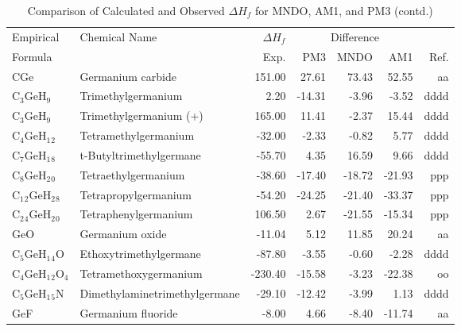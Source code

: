 \begin{table}
\caption{Comparison of Calculated and Observed $\Delta H_f$ 
for MNDO, AM1, and PM3 (contd.)}
\begin{center}
\compresstable
\begin{tabular}{llrrrrr}
Empirical & Chemical Name & $\Delta H_f$ & \multicolumn{3}{c}{Difference} & \\
Formula   &               & Exp. & PM3 &  MNDO  &  AM1 &     Ref.\\
\hline
 CGe         & Germanium carbide                      &   151.00    &    27.61  &    73.43  &    52.55  &     aa\\
 C$_3$GeH$_9$      & Trimethylgermanium                     &     2.20    &   -14.31  &    -3.96  &    -3.52  &   dddd\\
 C$_3$GeH$_9$      & Trimethylgermanium (+)                 &   165.00    &    11.41  &    -2.37  &    15.44  &   dddd\\
 C$_4$GeH$_1$$_2$     & Tetramethylgermanium                   &   -32.00    &    -2.33  &    -0.82  &     5.77  &   dddd\\
 C$_7$GeH$_1$$_8$     & t-Butyltrimethylgermane                &   -55.70    &     4.35  &    16.59  &     9.66  &   dddd\\
 C$_8$GeH$_2$$_0$     & Tetraethylgermanium                    &   -38.60    &   -17.40  &   -18.72  &   -21.93  &    ppp\\
 C$_1$$_2$GeH$_2$$_8$    & Tetrapropylgermanium                   &   -54.20    &   -24.25  &   -21.40  &   -33.37  &    ppp\\
 C$_2$$_4$GeH$_2$$_0$    & Tetraphenylgermanium                   &   106.50    &     2.67  &   -21.55  &   -15.34  &    ppp\\
 GeO         & Germanium oxide                        &   -11.04    &     5.12  &    11.85  &    20.24  &     aa\\
 C$_5$GeH$_1$$_4$O    & Ethoxytrimethylgermane                 &   -87.80    &    -3.55  &    -0.60  &    -2.28  &   dddd\\
 C$_4$GeH$_1$$_2$O$_4$   & Tetramethoxygermanium                  &  -230.40    &   -15.58  &    -3.23  &   -22.38  &     oo\\
 C$_5$GeH$_1$$_5$N    & Dimethylaminetrimethylgermane          &   -29.10    &   -12.42  &    -3.99  &     1.13  &   dddd\\
 GeF         & Germanium fluoride                     &    -8.00    &     4.66  &    -8.40  &   -11.74  &     aa\\

\end{tabular}
\end{center}
\end{table}
